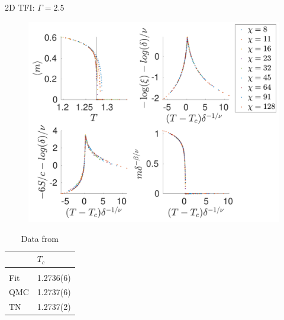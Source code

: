 \begin{frame}{2D TFI: $\Gamma=2.5$}
    \begin{minipage}{.75\textwidth}
        \begin{figure}
            \center
            \includegraphics[height=\textheight]{../Figuren/phasediag/g25/zoomed_small.pdf}
        \end{figure}
    \end{minipage}
    \begin{minipage}{.24\textwidth}
        \begin{table}[]

            \begin{tabular}{l|l }
                    & $T_c$     \\
                \hline          \\
                Fit & 1.2736(6) \\
                QMC & 1.2737(6) \\
                TN  & 1.2737(2) \\
            \end{tabular}
            \caption*{Data from  \cite{Czarnik2019} }
        \end{table}
    \end{minipage}
\end{frame}

